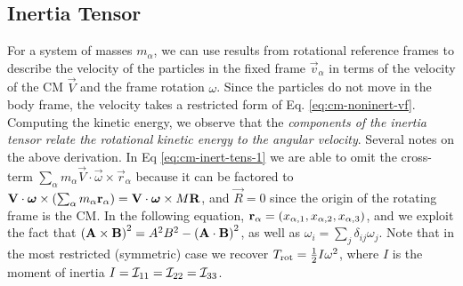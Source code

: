 \subsection{Inertia Tensor}
For a system of masses $m_{\alpha}$, we can use results from rotational reference frames to describe the velocity of the particles in the fixed frame $\vec{v}_{\alpha}$ in terms of the velocity of the CM $\vec{V}$ and the frame rotation $\omega$. Since the particles do not move in the body frame, the velocity takes a restricted form of Eq. \ref{eq:cm-noninert-vf}. Computing the kinetic energy, we observe that the \textit{components of the inertia tensor relate the rotational kinetic energy to the angular velocity}.
Several notes on the above derivation. In Eq \ref{eq:cm-inert-tens-1} we are able to omit the cross-term $\sum_{\alpha}m_{\alpha}\vec{V}\cdot \vec{\omega}\times\vec{r}_{\alpha}$ because it can be factored to $\boldsymbol{\mathbf{V}}\cdot\boldsymbol{\mathbf{\omega}}\times\left(\sum_{\alpha}m_{\alpha}\boldsymbol{\mathbf{r}}_{\alpha}\right) = \boldsymbol{\mathbf{V}}\cdot\boldsymbol{\mathbf{\omega}}\times M\boldsymbol{\mathbf{R}}$, and $\vec{R} = 0$ since the origin of the rotating frame is the CM. In the following equation, $\boldsymbol{\mathbf{r}}_{\alpha} = \left(x_{\alpha,1},x_{\alpha,2},x_{\alpha,3}\right)$, and we exploit the fact that $\left(\boldsymbol{\mathbf{A}}\times\boldsymbol{\mathbf{B}}\right)^2 = A^2B^2 - \left(\boldsymbol{\mathbf{A}}\cdot \boldsymbol{\mathbf{B}}\right)^2$, as well as $\omega_i = \sum_j \delta_{ij} \omega_j$. Note that in the most restricted (symmetric) case we recover $T_{\text{rot}} = \frac{1}{2} I \omega^2$, where $I$ is the moment of inertia $I = \mathcal{I}_{11} = \mathcal{I}_{22} = \mathcal{I}_{33}$.

